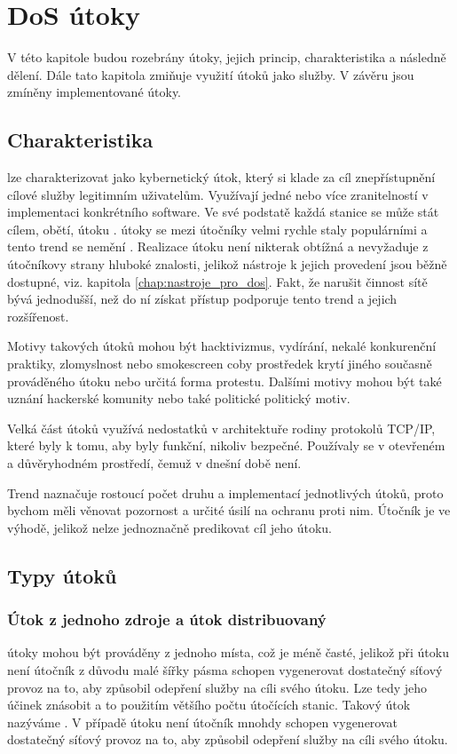 \chapter[DoS útoky]{DoS útoky}
V této kapitole budou rozebrány  útoky, jejich princip, charakteristika a následně dělení. Dále tato kapitola zmiňuje využití  útoků jako služby. V závěru jsou zmíněny implementované útoky.

\section{Charakteristika}
 lze charakterizovat jako kybernetický útok, který si klade za cíl znepřístupnění
 cílové služby legitimním uživatelům. Využívají jedné nebo více zranitelností v implementaci
 konkrétního software. Ve své podstatě každá stanice se může stát cílem, obětí, útoku
 .  útoky se mezi útočníky velmi rychle staly populárními a tento trend
 se nemění \cite{akamai_q2_2017}. Realizace  útoku není nikterak obtížná a
 nevyžaduje z útočníkovy strany hluboké znalosti, jelikož nástroje k jejich provedení jsou
 běžně dostupné, viz. kapitola \ref{chap:nastroje_pro_dos}. Fakt, že narušit činnost sítě bývá
 jednodušší, než do ní získat přístup podporuje tento trend a jejich rozšířenost. 

Motivy takových útoků mohou být hacktivizmus, vydírání, nekalé konkurenční praktiky,
zlomyslnost nebo smokescreen coby prostředek krytí jiného současně prováděného útoku nebo
určitá forma protestu. Dalšími motivy mohou být také uznání hackerské komunity nebo také
politické politický motiv.

Velká část útoků využívá nedostatků v architektuře rodiny protokolů TCP/IP, které byly k tomu,
aby byly funkční, nikoliv bezpečné. Používaly se v otevřeném a důvěryhodném prostředí, čemuž v
dnešní době není.

Trend naznačuje rostoucí počet druhu a implementací jednotlivých útoků, proto bychom měli
věnovat pozornost a určité úsilí na ochranu proti nim. Útočník je ve výhodě, jelikož nelze
jednoznačně predikovat cíl jeho útoku.


\section{Typy útoků}
\subsection{Útok z jednoho zdroje a útok distribuovaný}
 útoky mohou být prováděny z jednoho místa, což je méně časté, jelikož při
 útoku není útočník z důvodu malé šířky pásma schopen vygenerovat dostatečný síťový
provoz na to, aby způsobil odepření služby na cíli svého útoku. Lze tedy jeho účinek znásobit a
to použitím většího počtu útočících stanic. Takový útok nazýváme . V případě
 útoku není útočník mnohdy schopen vygenerovat dostatečný síťový provoz na to, aby
způsobil odepření služby na cíli svého útoku.

